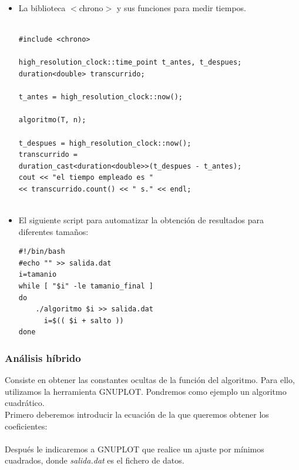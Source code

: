 \documentclass[a4paper,12pt,twoside]{article} %
\begin{document}
\begin{itemize}
	\item La biblioteca $<$chrono$>$ y sus funciones para medir tiempos.
	
	\lstset{language=C++}
	\begin{lstlisting}

#include <chrono>
	
high_resolution_clock::time_point t_antes, t_despues;
duration<double> transcurrido;

t_antes = high_resolution_clock::now();

algoritmo(T, n);

t_despues = high_resolution_clock::now();
transcurrido = 
duration_cast<duration<double>>(t_despues - t_antes);
cout << "el tiempo empleado es " 
<< transcurrido.count() << " s." << endl;
	
	\end{lstlisting}
	

	\item El siguiente script para automatizar la obtención de resultados para diferentes tamaños:

	\lstset{language=Bash}
	\begin{lstlisting}
#!/bin/bash 
#echo "" >> salida.dat
i=tamanio
while [ "$i" -le tamanio_final ]
do
    ./algoritmo $i >> salida.dat
      i=$(( $i + salto ))
done

	\end{lstlisting}
	
\end{itemize}

\newpage
\subsubsection{Análisis híbrido}

Consiste en obtener las constantes ocultas de la función del algoritmo. Para ello, utilizamos la herramienta GNUPLOT. Pondremos como ejemplo un algoritmo cuadrático.\\

Primero deberemos introducir la ecuación de la que queremos obtener los coeficientes:\\

\\

Después le indicaremos a GNUPLOT que realice un ajuste por mínimos cuadrados, donde \textit{salida.dat} es el fichero de datos.\\
\end{document}
